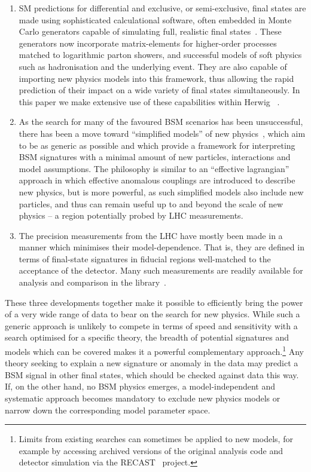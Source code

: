 \documentclass[floatfix]{article}
\begin{document}
\begin{enumerate}
\item
SM predictions for differential and exclusive, or semi-exclusive, final states are made using sophisticated 
calculational software, often embedded in Monte Carlo generators capable of simulating full, realistic final 
states~\cite{Buckley:2011ms}. These generators now incorporate matrix-elements for higher-order processes
matched to logarithmic parton showers, and successful models of soft physics such as hadronisation and
the underlying event. They are also capable of importing new physics models into this framework, thus allowing
the rapid prediction of their impact on a wide variety of final states simultaneously. 
In this paper we make extensive use of these capabilities within Herwig~\cite{Bahr:2008pv} .
\item
As the search for many of the favoured BSM scenarios has been unsuccessful, there has been a move toward 
``simplified models'' of new physics~\cite{Alves:2011wf,Abercrombie:2015wmb}, which aim to be as generic as possible 
and which provide a framework for interpreting BSM signatures with a minimal amount of 
new particles, interactions and model assumptions. The philosophy is similar to an ``effective lagrangian'' approach in which effective anomalous
couplings are introduced to describe new physics, but is more powerful, as such simplified models also
include new particles, and thus can remain useful up to and beyond the scale of new physics -- a region 
potentially probed by LHC measurements.
\item
The precision measurements from the LHC have mostly been made in a manner which minimises their model-dependence. 
That is, they are defined in terms of final-state signatures in fiducial regions well-matched to the
acceptance of the detector. Many such measurements are readily available for analysis and
comparison in the \rivet library~\cite{Buckley:2010ar}. 
\end{enumerate}

These three developments together make it possible to efficiently 
bring the power of a very wide range of data to bear on the search for new physics. While such a generic approach is
unlikely to compete in terms of speed and sensitivity with a search optimised for a specific theory, the breadth
of potential signatures and models which can be covered makes it a powerful complementary approach.\footnote{Limits from existing 
searches can sometimes be applied to new models, for example by accessing archived versions of the original analysis code
and detector simulation via the RECAST~\cite{Cranmer:2010hk} project.}
Any theory seeking
to explain a new signature or anomaly in the data may predict a BSM signal in other final states, which should be checked 
against data this way. If, on the other hand, no BSM physics emerges, a model-independent and systematic approach becomes mandatory to exclude 
new physics models or narrow down the corresponding model parameter space.
\end{document}
